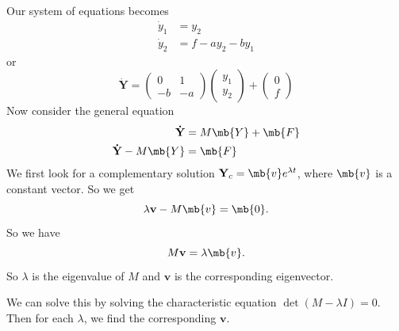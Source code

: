 \documentclass[a4paper]{article}
\begin{document}
    Our system of equations becomes
    \begin{align*}
      \dot y_1 &= y_2\\
      \dot y_2 &= f - a y_2 - by_1
    \end{align*}
    or
    \[
      \mathbf{\dot{Y}} = 
      \begin{pmatrix}
        0 & 1\\
        -b & -a
      \end{pmatrix}
      \begin{pmatrix}
        y_1\\y_2
      \end{pmatrix} + 
      \begin{pmatrix}
        0 \\ f
      \end{pmatrix}
    \]
    Now consider the general equation
    \begin{align*}
      \mathbf{\dot {Y}} &= M\mb{Y} + \mb{F}\\
      \mathbf{\dot {Y}} - M\mb{Y} &= \mb{F}
    \end{align*}
    We first look for a complementary solution $\mathbf{Y}_c = \mb{v} e^{\lambda t}$, where $\mb{v}$ is a constant vector. So we get
    \[
      \lambda\mathbf{v} - M\mb{v} = \mb{0}.
    \]
    So we have
    \[
      M\mathbf{v} = \lambda \mb{v}.
    \]
    So $\lambda$ is the eigenvalue of $M$ and $\mathbf{v}$ is the corresponding eigenvector.

    We can solve this by solving the characteristic equation $\det(M - \lambda I) = 0$. Then for each $\lambda$, we find the corresponding $\mathbf{v}$.
\end{document}
